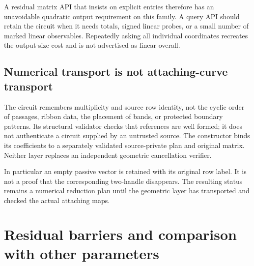 \documentclass[11pt,letterpaper]{article}
\theoremstyle{definition}
\theoremstyle{remark}
\begin{document}
A residual matrix API that insists on explicit entries therefore has an unavoidable quadratic output requirement on this family. A query API should retain the circuit when it needs totals, signed linear probes, or a small number of marked linear observables. Repeatedly asking all individual coordinates recreates the output-size cost and is not advertised as linear overall.

\subsection{Numerical transport is not attaching-curve transport}
The circuit remembers multiplicity and source row identity, not the cyclic order of passages, ribbon data, the placement of bands, or protected boundary patterns. Its structural validator checks that references are well formed; it does not authenticate a circuit supplied by an untrusted source. The constructor binds its coefficients to a separately validated source-private plan and original matrix. Neither layer replaces an independent geometric cancellation verifier.

In particular an empty passive vector is retained with its original row label. It is not a proof that the corresponding two-handle disappears. The resulting status remains a numerical reduction plan until the geometric layer has transported and checked the actual attaching maps.

\section{Residual barriers and comparison with other parameters}
\label{sec:barriers}
\end{document}
